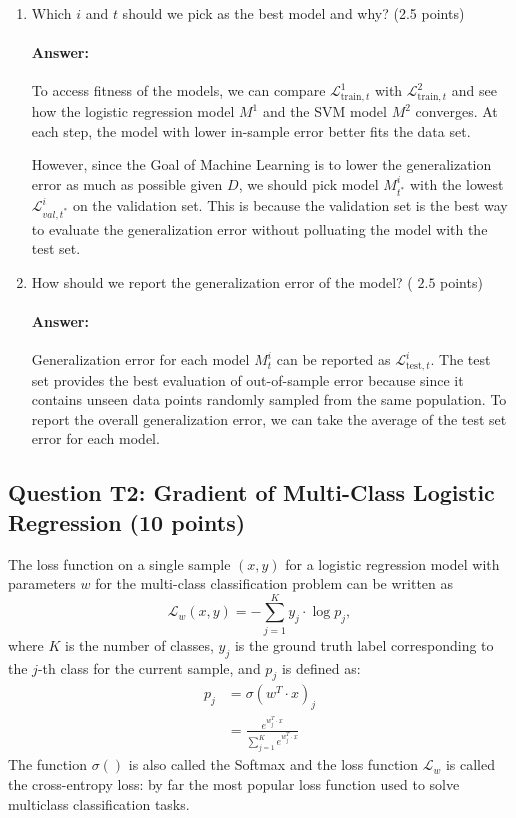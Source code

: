 \documentclass[10pt]{article}
\begin{document}
\begin{enumerate}
  \item Which $i$ and $t$ should we pick as the best model and why? (2.5 points)

  \paragraph{Answer:} To access fitness of the models, we can compare $\mathcal{L}_{\text {train}, t}^{1}$ with $\mathcal{L}_{\text {train}, t}^{2}$ and see how the logistic regression model $M^1$ and the SVM model $M^2$ converges. At each step, the model with lower in-sample error better fits the data set.

  However, since the Goal of Machine Learning is to lower the generalization error as much as possible given $D$, we should pick model $M^i_{t^*}$ with the lowest $\mathcal{L}_{v a l, t^*}^{i}$ on the validation set. This is because the validation set is the best way to evaluate the generalization error without polluating the model with the test set.

  \item How should we report the generalization error of the model? ( $2.5$ points)

  \paragraph{Answer:}
  Generalization error for each model $M^i_t$ can be reported as $\mathcal{L}_{\text {test}, t}^{i}$. The test set provides the best evaluation of out-of-sample error because since it contains unseen data points randomly sampled from the same population. To report the overall generalization error, we can take the average of the test set error for each model.
\end{enumerate}
\subsection*{Question T2: Gradient of Multi-Class Logistic Regression (10 points)}
The loss function on a single sample $(x, y)$ for a logistic regression model with parameters $w$ for the multi-class classification problem can be written as
$$
\mathcal{L}_{w}(x, y)=-\sum_{j=1}^{K} y_{j} \cdot \log p_{j},
$$
where $K$ is the number of classes, $y_{j}$ is the ground truth label corresponding to the $j$-th class for the current sample, and $p_{j}$ is defined as:
$$
\begin{aligned}
p_{j} &=\sigma\left(w^{T} \cdot x\right)_{j} \\
&=\frac{e^{w_{j}^{T} \cdot x}}{\sum_{j=1}^{K} e^{w_{j}^{T} \cdot x}}
\end{aligned}
$$
The function $\sigma()$ is also called the Softmax and the loss function $\mathcal{L}_{w}$ is called the cross-entropy loss: by far the most popular loss function used to solve multiclass classification tasks.
\end{document}
